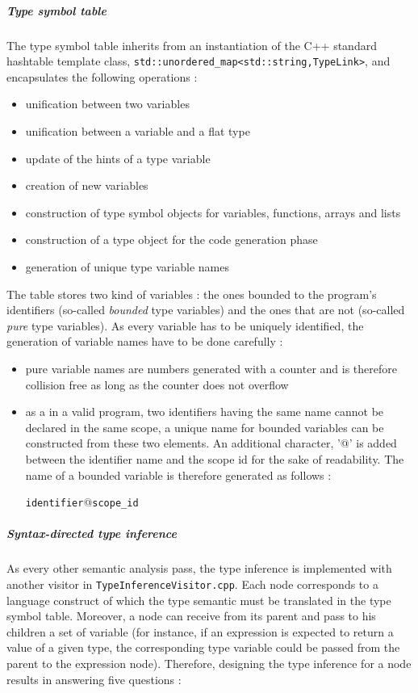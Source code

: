 \documentclass[a4paper,11pt]{article}
\begin{document}
\subparagraph{Type symbol table} The type symbol table inherits from an instantiation of the C++ standard hashtable template class, \texttt{std::unordered\_map<std::string,TypeLink>}, and encapsulates the following operations :
\begin{itemize}
	\item unification between two variables
	\item unification between a variable and a flat type
	\item update of the hints of a type variable
	\item creation of new variables
	\item construction of type symbol objects for variables, functions, arrays and lists
	\item construction of a type object for the code generation phase
	\item generation of unique type variable names
\end{itemize}
The table stores two kind of variables : the ones bounded to the program's identifiers (so-called \textit{bounded} type variables) and the ones that are not (so-called \textit{pure} type variables). As every variable has to be uniquely identified, the generation of variable names have to be done carefully :
\begin{itemize}
	\item pure variable names are numbers generated with a counter and is therefore collision free as long as the counter does not overflow
	\item as a in a valid program, two identifiers having the same name cannot be declared in the same scope, a unique name for bounded variables can be constructed from these two elements. An additional character, '@' is added between the identifier name and the scope id for the sake of readability. The name of a bounded variable is therefore generated as follows :
	\begin{center}
		\texttt{identifier}@\texttt{scope\_id}
	\end{center}
\end{itemize}
\subparagraph{Syntax-directed type inference} As every other semantic analysis pass, the type inference is implemented with another visitor in \texttt{TypeInferenceVisitor.cpp}. Each node corresponds to a language construct of which the type semantic must be translated in the type symbol table. Moreover, a node can receive from its parent and pass to his children a set of variable (for instance, if an expression is expected to return a value of a given type, the corresponding type variable could be passed from the parent to the expression node). Therefore, designing the type inference for a node results in answering five questions :
\end{document}
